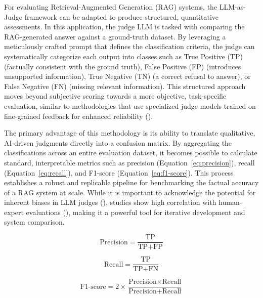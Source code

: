             For evaluating Retrieval-Augmented Generation (RAG) systems, the LLM-as-Judge framework can be adapted to produce structured, quantitative assessments. 
            In this application, the judge LLM is tasked with comparing the RAG-generated answer against a ground-truth dataset.
            By leveraging a meticulously crafted prompt that defines the classification criteria, the judge can systematically categorize each output into classes such as True Positive (TP) (factually consistent with the ground truth), False Positive (FP) (introduces unsupported information), True Negative (TN) (a correct refusal to answer), or False Negative (FN) (missing relevant information). This structured approach moves beyond subjective scoring towards a more objective, task-specific evaluation, similar to methodologies that use specialized judge models trained on fine-grained feedback for enhanced reliability (\citep{Kim2024}).

            The primary advantage of this methodology is its ability to translate qualitative, AI-driven judgments directly into a confusion matrix. By aggregating the classifications across an entire evaluation dataset, it becomes possible to calculate standard, interpretable metrics such as precision (Equation~\ref{eq:precision}), recall (Equation~\ref{eq:recall}), and F1-score (Equation~\ref{eq:f1-score}). This process establishes a robust and replicable pipeline for benchmarking the factual accuracy of a RAG system at scale. While it is important to acknowledge the potential for inherent biases in LLM judges (\citep{Gu2025}), studies show high correlation with human-expert evaluations (\citep{li2024llmsasjudgescomprehensivesurveyllmbased}), making it a powerful tool for iterative development and system comparison.

            \begin{equation}
                \text{Precision} = \frac{\text{TP}}{\text{TP} + \text{FP}}
                \label{eq:precision}
            \end{equation}

            \begin{equation}
                \text{Recall} = \frac{\text{TP}}{\text{TP} + \text{FN}}
                \label{eq:recall}
            \end{equation}

            \begin{equation}
                \text{F1-score} = 2 \times \frac{\text{Precision} \times \text{Recall}}{\text{Precision} + \text{Recall}}
                \label{eq:f1-score}
            \end{equation}

